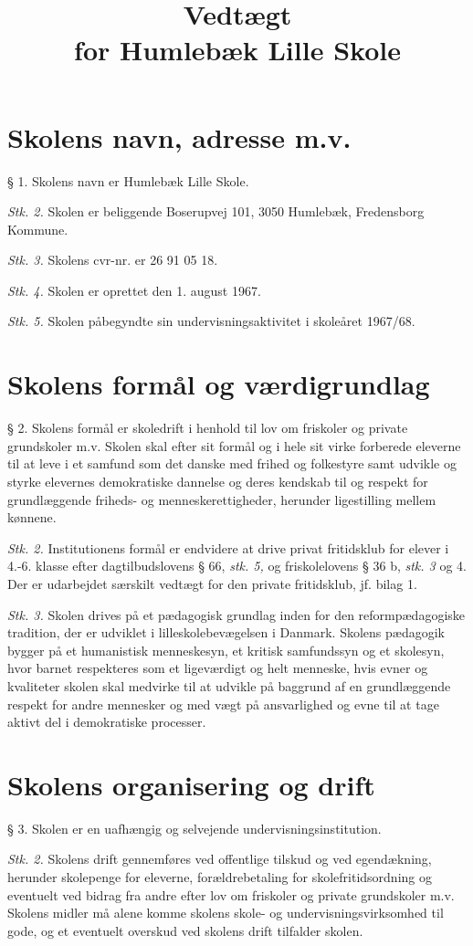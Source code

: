 \documentclass[11pt, a4paper]{article}
\title{\textbf{Vedtægt}\\[0.3em] \Large for Humlebæk Lille Skole}
\date{} %
\begin{document}
\section*{Skolens navn, adresse m.v.}
§ 1. Skolens navn er Humlebæk Lille Skole.

\textit{Stk. 2.} Skolen er beliggende Boserupvej 101, 3050 Humlebæk, Fredensborg Kommune.

\textit{Stk. 3.} Skolens cvr-nr. er 26 91 05 18.

\textit{Stk. 4.} Skolen er oprettet den 1. august 1967.

\textit{Stk. 5.} Skolen påbegyndte sin undervisningsaktivitet i skoleåret 1967/68.

\section*{Skolens formål og værdigrundlag}
§ 2. Skolens formål er skoledrift i henhold til lov om friskoler og private grundskoler m.v. Skolen skal efter sit formål og i hele sit virke forberede eleverne til at leve i et samfund som det danske med frihed og folkestyre samt udvikle og styrke elevernes demokratiske dannelse og deres kendskab til og respekt for grundlæggende friheds- og menneskerettigheder, herunder ligestilling mellem kønnene.

\textit{Stk. 2.} Institutionens formål er endvidere at drive privat fritidsklub for elever i 4.-6. klasse efter dagtilbudslovens § 66, \textit{stk. 5,} og friskolelovens § 36 b, \textit{stk. 3 }og 4. Der er udarbejdet særskilt vedtægt for den private fritidsklub, jf. bilag 1.

\textit{Stk. 3.} Skolen drives på et pædagogisk grundlag inden for den reformpædagogiske tradition, der er udviklet i lilleskolebevægelsen i Danmark. Skolens pædagogik bygger på et humanistisk menneskesyn, et kritisk samfundssyn og et skolesyn, hvor barnet respekteres som et ligeværdigt og helt menneske, hvis evner og kvaliteter skolen skal medvirke til at udvikle på baggrund af en grundlæggende respekt for andre mennesker og med vægt på ansvarlighed og evne til at tage aktivt del i demokratiske processer.

\section*{Skolens organisering og drift}
§ 3. Skolen er en uafhængig og selvejende undervisningsinstitution.

\textit{Stk. 2.} Skolens drift gennemføres ved offentlige tilskud og ved egendækning, herunder skolepenge for eleverne, forældrebetaling for skolefritidsordning og eventuelt ved bidrag fra andre efter lov om friskoler og private grundskoler m.v. Skolens midler må alene komme skolens skole- og undervisningsvirksomhed til gode, og et eventuelt overskud ved skolens drift tilfalder skolen.
\end{document}
